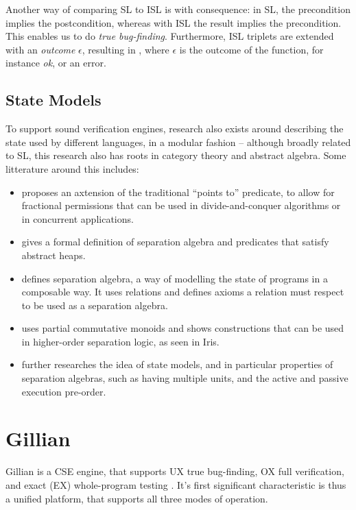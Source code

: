 Another way of comparing SL to ISL is with consequence: in SL, the precondition implies the postcondition, whereas with ISL the result implies the precondition. This enables us to do \emph{true bug-finding}. Furthermore, ISL triplets are extended with an \emph{outcome} $\epsilon$, resulting in , where $\epsilon$ is the outcome of the function, for instance \textit{ok}, or an error.


\subsection{State Models}

To support sound verification engines, research also exists around describing the state used by different languages, in a modular fashion -- although broadly related to SL, this research also has roots in category theory and abstract algebra. Some litterature around this includes:

\begin{itemize}
	\item {} proposes an axtension of the traditional ``points to'' predicate, to allow for fractional permissions that can be used in divide-and-conquer algorithms or in concurrent applications.
	\item {} gives a formal definition of separation algebra and predicates that satisfy abstract heaps.
	\item {} defines separation algebra, a way of modelling the state of programs in a composable way. It uses relations and defines axioms a relation must respect to be used as a separation algebra.
	\item {} uses partial commutative monoids and shows constructions that can be used in higher-order separation logic, as seen in Iris.
	\item {} further researches the idea of state models, and in particular properties of separation algebras, such as having multiple units, and the active and passive execution pre-order.
\end{itemize}

\section{Gillian}

Gillian \cite{gillian0, gillian1, gillian2} is a CSE engine, that supports UX true bug-finding, OX full verification, and exact (EX) whole-program testing \cite{exactsl}. It's first significant characteristic is thus a unified platform, that supports all three modes of operation. 


